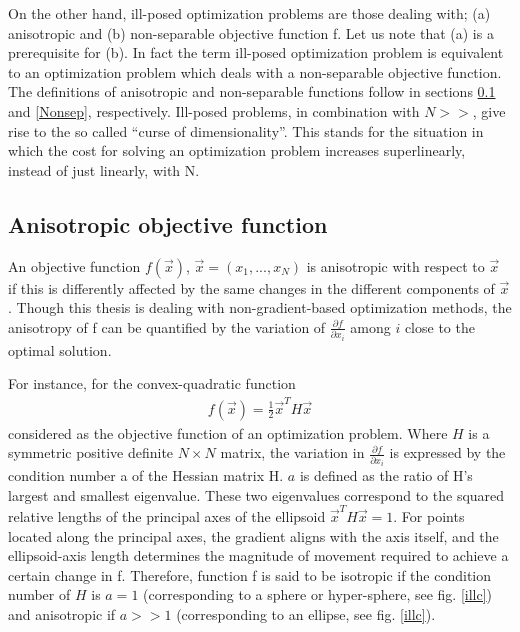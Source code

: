 On the other hand, ill-posed optimization problems are those dealing with; (a) anisotropic and (b)  non-separable objective function f. Let us note that (a) is a prerequisite for (b). In fact the term ill-posed optimization problem is equivalent to an optimization problem which deals with a non-separable objective function. The definitions of anisotropic and non-separable functions follow in sections \ref{IllCon} and \ref{Nonsep}, respectively. Ill-posed problems, in combination with $N\!>>$, give rise to the so called ``curse of dimensionality''. This stands for the situation in which the cost for solving an optimization problem increases superlinearly, instead of just linearly, with N. 


\subsection{Anisotropic objective function}
\label{IllCon}
An objective function $f(\vec{x})$, $\vec{x}=(x_1,...,x_N)$  is anisotropic with respect to $\vec{x}$ if this is differently affected by the same changes in the different components of $\vec{x}$. Though this thesis is dealing with non-gradient-based optimization methods, the anisotropy of f can be quantified by the variation of $\frac{\partial f}{\partial x_i}$ among $i$ close to the optimal solution. 



For instance, for the convex-quadratic function
\begin{eqnarray}
   f(\vec{x}) = \frac{1}{2}\vec{x}^TH\vec{x}
   \label{conv.1}
\end{eqnarray}
considered as the objective function of an optimization problem. Where $H$ is a symmetric positive definite $N \times N$ matrix,
the variation in $\frac{\partial f}{\partial x_i}$  is expressed by the condition number a of the Hessian matrix H. $a$ is defined as the ratio of H's largest and smallest eigenvalue. 
These two eigenvalues correspond to the squared relative lengths of the principal axes of the ellipsoid $\vec{x}^TH\vec{x} = 1$. For points located along the principal axes, the gradient aligns with the axis itself, and the ellipsoid-axis length determines the magnitude of movement required to achieve a certain change in f. Therefore, function f is said to be isotropic if the condition number of $H$ is $a=1$ (corresponding to a sphere or hyper-sphere, see fig. \ref{illc}) and anisotropic if $a\!>>\!1$ (corresponding to an ellipse, see fig. \ref{illc}).

